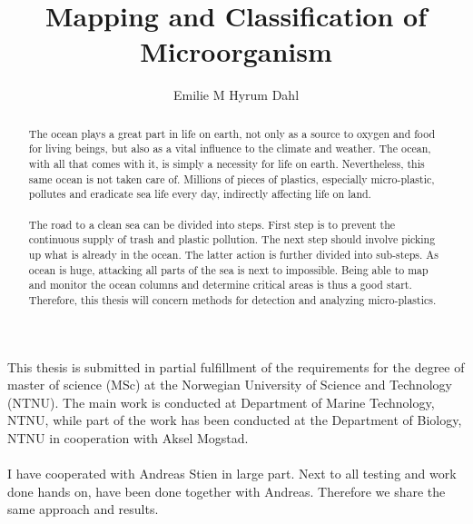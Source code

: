 \documentclass[phd,tocprelim]{thesis}
\title {Mapping and Classification of Microorganism}
\author {Emilie M Hyrum Dahl}
\begin{document}

\maketitle
\makecopyright

\begin{abstract}
The ocean plays a great part in life on earth, not only as a source to oxygen and food for living beings, but also as a vital influence to the climate and weather. The ocean, with all that comes with it, is simply a necessity for life on earth. Nevertheless, this same ocean is not taken care of. Millions of pieces of plastics, especially micro-plastic, pollutes and eradicate sea life every day, indirectly affecting life on land. 
\\\\
The road to a clean sea can be divided into steps. First step is to prevent the continuous supply of trash and plastic pollution. The next step should involve picking up what is already in the ocean. The latter action is further divided into sub-steps. As ocean is huge, attacking all parts of the sea is next to impossible. Being able to map and monitor the ocean columns and determine critical areas is thus a good start. Therefore, this thesis will concern methods for detection and analyzing micro-plastics. 

\end{abstract}

\begin{preface}
This thesis is submitted in partial fulfillment of the requirements for the degree of master of science (MSc) at the Norwegian University of Science and Technology (NTNU). The main work is conducted at Department of Marine Technology, NTNU, while part of the work has been conducted at the Department of Biology, NTNU in cooperation with Aksel Mogstad. 
\\\\
I have cooperated with Andreas Stien in large part. Next to all testing and work done hands on, have been done together with Andreas. Therefore we share the same approach and results. 


\end{preface}
\end{document}
